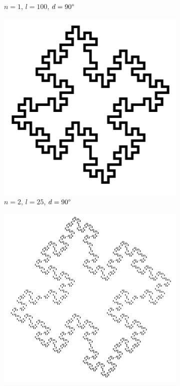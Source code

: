 \begin{figure} [hbtp]
\begin{subfigure}[t]{.3\textwidth}
		\caption{$n=1$, $l=100$, $d=90\degree$}
		\label{fig:KochkurveN1L100}
	\end{subfigure}
	\medskip
	\begin{subfigure}[t]{.3\textwidth}
		\includegraphics[width=\linewidth]{images/KochkurveN2L25.png}
		\caption{$n=2$, $l=25$, $d=90\degree$}
		\label{fig:KochkurveN2L25}
	\end{subfigure}
	\hspace{.1\textwidth}
	\begin{subfigure}[t]{.3\textwidth}
		\centering
		\includegraphics[width=\linewidth]{images/KochkurveN3L6_25.png}

\end{subfigure}
\end{figure}
